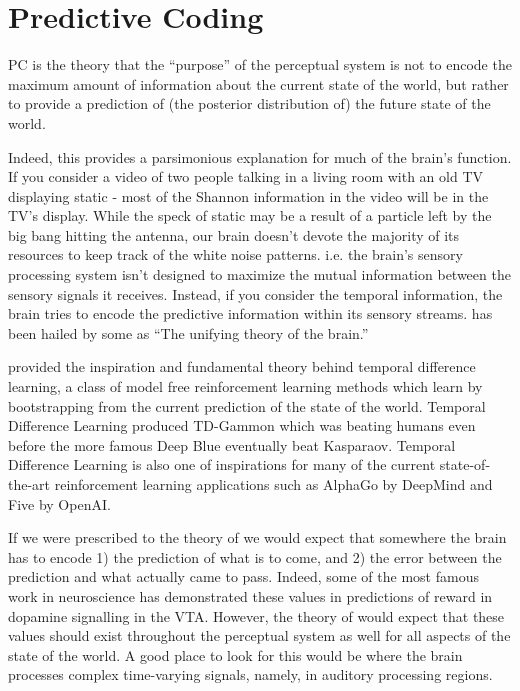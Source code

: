 \chapter{Predictive Coding}

\acf{PC} is the theory that the ``purpose'' of the perceptual system is not to encode the maximum amount of information about the current state of the world, but rather to provide a prediction of (the posterior distribution of) the future state of the world. 

Indeed, this provides a parsimonious explanation for much of the brain's function. If you consider a video of two people talking in a living room with an old TV displaying static - most of the Shannon information in the video will be in the TV's display. While the speck of static may be a result of a particle left by the big bang hitting the antenna, our brain doesn't devote the majority of its resources to keep track of the white noise patterns. i.e. the brain's sensory processing system isn't designed to maximize the mutual information between the sensory signals it receives. Instead, if you consider the temporal information, the brain tries to encode the predictive information within its sensory streams. \PC has been hailed by some as ``The unifying theory of the brain.''

\PC provided the inspiration and fundamental theory behind temporal difference learning, a class of model free reinforcement learning methods which learn by bootstrapping from the current prediction of the state of the world. Temporal Difference Learning produced TD-Gammon which was beating humans even before the more famous Deep Blue eventually beat Kasparaov. Temporal Difference Learning is also one of inspirations for many of the current state-of-the-art reinforcement learning applications such as AlphaGo by DeepMind and Five by OpenAI.

If we were prescribed to the theory of \PC we would expect that somewhere the brain has to encode 1) the prediction of what is to come, and 2) the error between the prediction and what actually came to pass. Indeed, some of the most famous work in neuroscience has demonstrated these values in predictions of reward in dopamine signalling in the VTA. However, the theory of \PC would expect that these values should exist throughout the perceptual system as well for all aspects of the state of the world. A good place to look for this would be where the brain processes complex time-varying signals, namely, in auditory processing regions.

